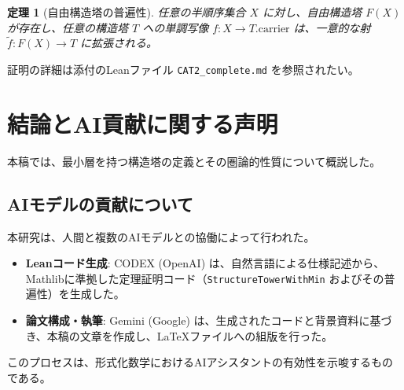 \documentclass[11pt, a4paper]{article}
\newtheorem{theorem}{定理}[section]
\begin{document}
\begin{theorem}[自由構造塔の普遍性]
任意の半順序集合 $X$ に対し、自由構造塔 $F(X)$ が存在し、任意の構造塔 $T$ への単調写像 $f: X \to T.\mathrm{carrier}$ は、一意的な射 $\tilde{f}: F(X) \to T$ に拡張される。
\end{theorem}

証明の詳細は添付のLeanファイル \texttt{CAT2\_complete.md} を参照されたい。

\section{結論とAI貢献に関する声明}

本稿では、最小層を持つ構造塔の定義とその圏論的性質について概説した。

\subsection*{AIモデルの貢献について}
本研究は、人間と複数のAIモデルとの協働によって行われた。
\begin{itemize}
    \item \textbf{Leanコード生成}: CODEX (OpenAI) は、自然言語による仕様記述から、Mathlibに準拠した定理証明コード（\texttt{StructureTowerWithMin} およびその普遍性）を生成した。
    \item \textbf{論文構成・執筆}: Gemini (Google) は、生成されたコードと背景資料に基づき、本稿の文章を作成し、LaTeXファイルへの組版を行った。
\end{itemize}

このプロセスは、形式化数学におけるAIアシスタントの有効性を示唆するものである。
\end{document}
